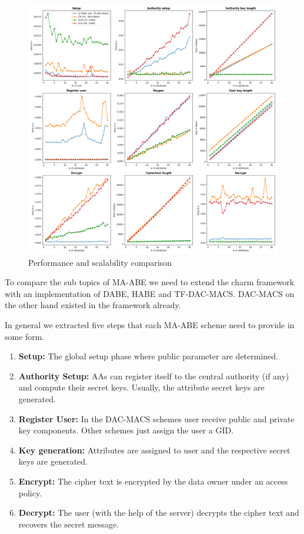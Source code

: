 \begin{figure}[!ht]
\centering
    \includegraphics[width=1\linewidth]{img/maabe_comparisons.png}
    \caption{Performance and scalability comparison}
    \label{fig:maabe_comparison}
\end{figure}

To compare the sub topics of \ac{MA-ABE} we need to extend the charm framework with an implementation of \ac{DABE}, \ac{HABE} and \ac{TF-DAC-MACS}. \ac{DAC-MACS} on the other hand existed in the framework already. 

In general we extracted five steps that each \ac{MA-ABE} scheme need to provide in some form. 
\begin{enumerate}
	\item \textbf{Setup:} The global setup phase where public parameter are determined.
	\item \textbf{Authority Setup:} \ac{AA}s can register itself to the central authority (if any) and compute their secret keys. Usually, the attribute secret keys are generated. 
	\item \textbf{Register User:} In the \ac{DAC-MACS} schemes user receive public and private key components. Other schemes just assign the user a \ac{GID}.
	\item \textbf{Key generation:} Attributes are assigned to user and the respective secret keys are generated.
	\item \textbf{Encrypt:} The cipher text is encrypted by the data owner under an access policy.
	\item \textbf{Decrypt:} The user (with the help of the server) decrypts the cipher text and recovers the secret message. 
\end{enumerate}

